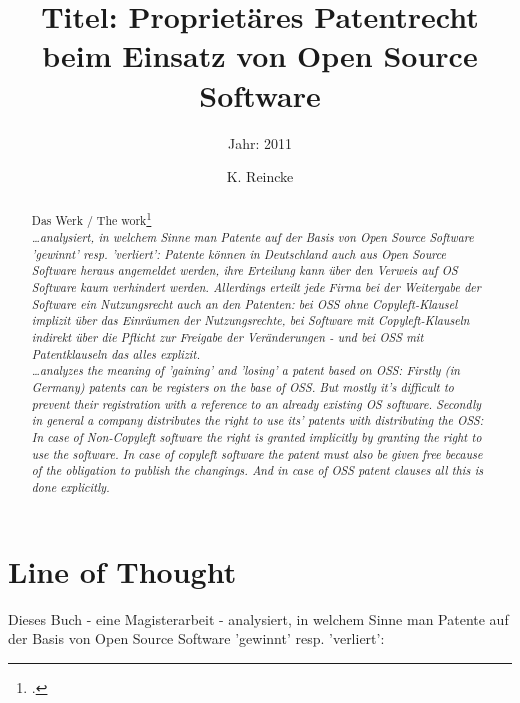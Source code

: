 \documentclass[DIV=calc,BCOR=5mm,11pt,headings=small,oneside,abstract=true, toc=bib]{scrartcl}
\begin{document}

\titlehead{Literaturexzerpt}
\subject{Autor(en): Bernd Suchomski}
\title{Titel: Proprietäres Patentrecht beim Einsatz von Open Source
Software}
\subtitle{Jahr: 2011 }
\author{K. Reincke}

\maketitle

\begin{abstract}
\noindent
Das Werk / The work\footcite[][]{Suchomski2011a} \\
\noindent \itshape
\ldots analysiert, in welchem Sinne man Patente auf der Basis von Open Source
Software 'gewinnt' resp. 'verliert': Patente können in Deutschland auch aus Open
Source Software heraus angemeldet werden, ihre Erteilung kann über den Verweis
auf OS Software kaum verhindert werden. Allerdings erteilt jede Firma bei der
Weitergabe der Software ein Nutzungsrecht auch an den Patenten: bei OSS ohne
Copyleft-Klausel implizit über das Einräumen der Nutzungsrechte, bei Software
mit Copyleft-Klauseln indirekt über die Pflicht zur Freigabe der Veränderungen -
und bei OSS mit Patentklauseln das alles explizit.
\\
\noindent
\ldots analyzes the meaning of 'gaining' and 'losing' a patent based on OSS:
Firstly (in Germany) patents can be registers on the base of OSS. But mostly
it's difficult to prevent their registration with a reference to an already
existing OS software. Secondly in general a company distributes the right to use
its' patents with distributing the OSS: In case of Non-Copyleft software the
right is granted implicitly by granting the right to use the software. In case
of copyleft software the patent must also be given free because of the
obligation to publish the changings. And in case of OSS patent clauses all this
is done
explicitly.
\end{abstract}
\footnotesize
\normalsize

\section{Line of Thought}

Dieses Buch - eine Magisterarbeit - analysiert, in welchem Sinne man Patente auf
der Basis von Open Source Software 'gewinnt' resp. 'verliert':
\end{document}
